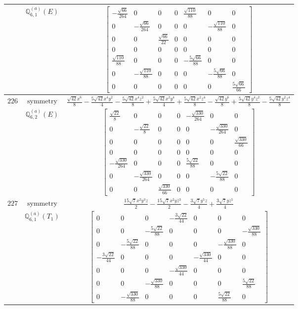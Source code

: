 \documentclass[fleqn,8pt,landscape]{jsarticle}
\begin{document}
\begin{longtable}{ccc}
$  $ & $ \mathbb{Q}_{6,1}^{(a)}(E) $ & $ \begin{bmatrix} - \frac{\sqrt{66}}{264} & 0 & 0 & 0 & \frac{\sqrt{110}}{88} & 0 & 0 \\ 0 & - \frac{\sqrt{66}}{264} & 0 & 0 & 0 & - \frac{\sqrt{110}}{88} & 0 \\ 0 & 0 & \frac{\sqrt{66}}{22} & 0 & 0 & 0 & 0 \\ 0 & 0 & 0 & 0 & 0 & 0 & 0 \\ \frac{\sqrt{110}}{88} & 0 & 0 & 0 & - \frac{5 \sqrt{66}}{88} & 0 & 0 \\ 0 & - \frac{\sqrt{110}}{88} & 0 & 0 & 0 & - \frac{5 \sqrt{66}}{88} & 0 \\ 0 & 0 & 0 & 0 & 0 & 0 & \frac{5 \sqrt{66}}{66} \end{bmatrix} $ \\ \hline
$ 226 $ & $ \text{symmetry} $ & $ \frac{\sqrt{42} x^{6}}{8} - \frac{5 \sqrt{42} x^{4} y^{2}}{4} - \frac{5 \sqrt{42} x^{4} z^{2}}{8} + \frac{5 \sqrt{42} x^{2} y^{4}}{4} + \frac{5 \sqrt{42} x^{2} z^{4}}{8} - \frac{\sqrt{42} y^{6}}{8} + \frac{5 \sqrt{42} y^{4} z^{2}}{8} - \frac{5 \sqrt{42} y^{2} z^{4}}{8} $ \\
$  $ & $ \mathbb{Q}_{6,2}^{(a)}(E) $ & $ \begin{bmatrix} \frac{\sqrt{22}}{8} & 0 & 0 & 0 & - \frac{\sqrt{330}}{264} & 0 & 0 \\ 0 & - \frac{\sqrt{22}}{8} & 0 & 0 & 0 & - \frac{\sqrt{330}}{264} & 0 \\ 0 & 0 & 0 & 0 & 0 & 0 & \frac{\sqrt{330}}{66} \\ 0 & 0 & 0 & 0 & 0 & 0 & 0 \\ - \frac{\sqrt{330}}{264} & 0 & 0 & 0 & \frac{5 \sqrt{22}}{88} & 0 & 0 \\ 0 & - \frac{\sqrt{330}}{264} & 0 & 0 & 0 & - \frac{5 \sqrt{22}}{88} & 0 \\ 0 & 0 & \frac{\sqrt{330}}{66} & 0 & 0 & 0 & 0 \end{bmatrix} $ \\ \hline
$ 227 $ & $ \text{symmetry} $ & $ \frac{15 \sqrt{7} x^{2} y^{3} z}{2} - \frac{15 \sqrt{7} x^{2} y z^{3}}{2} - \frac{3 \sqrt{7} y^{5} z}{4} + \frac{3 \sqrt{7} y z^{5}}{4} $ \\
$  $ & $ \mathbb{Q}_{6,1}^{(a)}(T_{1}) $ & $ \begin{bmatrix} 0 & 0 & 0 & - \frac{3 \sqrt{22}}{44} & 0 & 0 & 0 \\ 0 & 0 & - \frac{5 \sqrt{22}}{88} & 0 & 0 & 0 & - \frac{\sqrt{330}}{88} \\ 0 & - \frac{5 \sqrt{22}}{88} & 0 & 0 & 0 & - \frac{\sqrt{330}}{88} & 0 \\ - \frac{3 \sqrt{22}}{44} & 0 & 0 & 0 & - \frac{\sqrt{330}}{44} & 0 & 0 \\ 0 & 0 & 0 & - \frac{\sqrt{330}}{44} & 0 & 0 & 0 \\ 0 & 0 & - \frac{\sqrt{330}}{88} & 0 & 0 & 0 & \frac{5 \sqrt{22}}{88} \\ 0 & - \frac{\sqrt{330}}{88} & 0 & 0 & 0 & \frac{5 \sqrt{22}}{88} & 0 \end{bmatrix} $ \\ \hline

\end{longtable}
\end{document}
